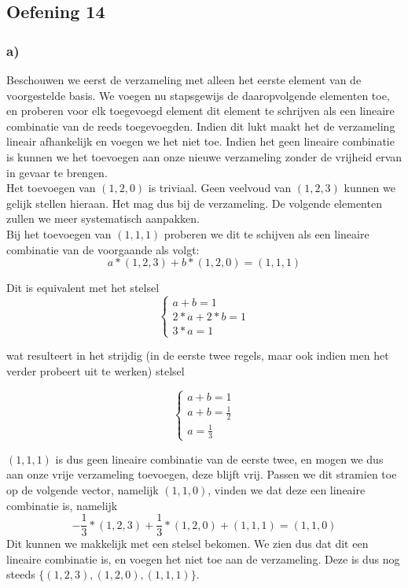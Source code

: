 \documentclass[lineaire_algebra_oplossingen.tex]{subfiles}
\begin{document}
\subsection{Oefening 14}

\subsubsection*{a)}
Beschouwen we eerst de verzameling met alleen het eerste element van de voorgestelde basis. We voegen nu stapsgewijs de daaropvolgende elementen toe, en proberen voor elk toegevoegd element dit element te schrijven als een lineaire combinatie van de reeds toegevoegden. Indien dit lukt maakt het de verzameling lineair afhankelijk en voegen we het niet toe. Indien het geen lineaire combinatie is kunnen we het toevoegen aan onze nieuwe verzameling zonder de vrijheid ervan in gevaar te brengen.\\

Het toevoegen van $(1,2,0)$ is triviaal. Geen veelvoud van $(1,2,3)$ kunnen we gelijk stellen hieraan. Het mag dus bij de verzameling. De volgende elementen zullen we meer systematisch aanpakken.\\

Bij het toevoegen van $(1,1,1)$ proberen we dit te schijven als een lineaire combinatie van de voorgaande als volgt:\\
\[
a * (1,2,3) + b * (1,2,0) = (1,1,1)
\]

Dit is equivalent met het stelsel
\[
\left\{
\begin{array}{l}
a + b = 1\\
2*a + 2*b = 1\\
3*a = 1
\end{array} \right.
\]

wat resulteert in het strijdig (in de eerste twee regels, maar ook indien men het verder probeert uit te werken) stelsel

\[
\left\{
\begin{array}{l}
a + b = 1\\
a + b = \frac{1}{2}\\
a = \frac{1}{3}
\end{array} \right.
\]

$(1,1,1)$ is dus geen lineaire combinatie van de eerste twee, en mogen we dus aan onze vrije verzameling toevoegen, deze blijft vrij. Passen we dit stramien toe op de volgende vector, namelijk $(1,1,0)$, vinden we dat deze een lineaire combinatie is, namelijk
\[
-\frac{1}{3} * (1,2,3) + \frac{1}{3} * (1,2,0) + (1,1,1) = (1,1,0)
\]
Dit kunnen we makkelijk met een stelsel bekomen. We zien dus dat dit een lineaire combinatie is, en voegen het niet toe aan de verzameling. Deze is dus nog steeds $\{(1,2,3), (1,2,0), (1,1,1)\}$.
\end{document}
